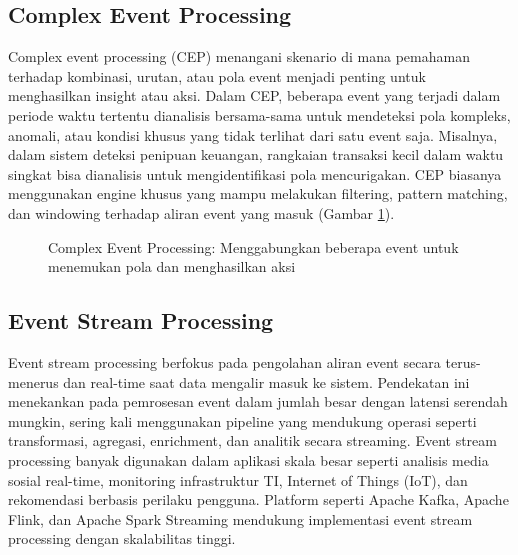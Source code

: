 \subsection{Complex Event Processing}
Complex event processing (CEP) menangani skenario di mana pemahaman terhadap kombinasi, urutan, atau pola event menjadi penting untuk menghasilkan insight atau aksi. Dalam CEP, beberapa event yang terjadi dalam periode waktu tertentu dianalisis bersama-sama untuk mendeteksi pola kompleks, anomali, atau kondisi khusus yang tidak terlihat dari satu event saja. Misalnya, dalam sistem deteksi penipuan keuangan, rangkaian transaksi kecil dalam waktu singkat bisa dianalisis untuk mengidentifikasi pola mencurigakan. CEP biasanya menggunakan engine khusus yang mampu melakukan filtering, pattern matching, dan windowing terhadap aliran event yang masuk (Gambar \ref{fig:cep}).

\begin{figure}[h]
	\centering
	\caption{Complex Event Processing: Menggabungkan beberapa event untuk menemukan pola dan menghasilkan aksi}
	\label{fig:cep}
\end{figure}

\subsection{Event Stream Processing}
Event stream processing berfokus pada pengolahan aliran event secara terus-menerus dan real-time saat data mengalir masuk ke sistem. Pendekatan ini menekankan pada pemrosesan event dalam jumlah besar dengan latensi serendah mungkin, sering kali menggunakan pipeline yang mendukung operasi seperti transformasi, agregasi, enrichment, dan analitik secara streaming. Event stream processing banyak digunakan dalam aplikasi skala besar seperti analisis media sosial real-time, monitoring infrastruktur TI, Internet of Things (IoT), dan rekomendasi berbasis perilaku pengguna. Platform seperti Apache Kafka, Apache Flink, dan Apache Spark Streaming mendukung implementasi event stream processing dengan skalabilitas tinggi. 

